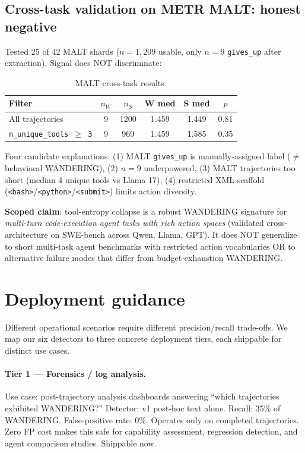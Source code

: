 \documentclass[11pt]{article}
\begin{document}
\subsection{Cross-task validation on METR MALT: honest negative}\label{sec:malt}
Tested 25 of 42 MALT shards ($n = 1{,}209$ usable, only $n = 9$ \texttt{gives\_up} after extraction). Signal does NOT discriminate:

\begin{table}[h]
\centering
\caption{MALT cross-task results.}
\begin{tabular}{lccccc}
\toprule
Filter & $n_W$ & $n_S$ & W med & S med & $p$ \\
\midrule
All trajectories & 9 & 1200 & 1.459 & 1.449 & 0.81 \\
\texttt{n\_unique\_tools $\geq$ 3} & 9 & 969 & 1.459 & 1.585 & 0.35 \\
\bottomrule
\end{tabular}
\end{table}

Four candidate explanations: (1) MALT \texttt{gives\_up} is manually-assigned label ($\ne$ behavioral WANDERING), (2) $n=9$ underpowered, (3) MALT trajectories too short (median 4 unique tools vs Llama 17), (4) restricted XML scaffold (\texttt{<bash>}/\texttt{<python>}/\texttt{<submit>}) limits action diversity.

\textbf{Scoped claim}: tool-entropy collapse is a robust WANDERING signature for \emph{multi-turn code-execution agent tasks with rich action spaces} (validated cross-architecture on SWE-bench across Qwen, Llama, GPT). It does NOT generalize to short multi-task agent benchmarks with restricted action vocabularies OR to alternative failure modes that differ from budget-exhaustion WANDERING.

\section{Deployment guidance}\label{sec:deployment}

Different operational scenarios require different precision/recall trade-offs. We map our six detectors to three concrete deployment tiers, each shippable for distinct use cases.

\paragraph{Tier 1 — Forensics / log analysis.} Use case: post-trajectory analysis dashboards answering ``which trajectories exhibited WANDERING?'' Detector: v1 post-hoc text alone. Recall: 35\% of WANDERING. False-positive rate: 0\%. Operates only on completed trajectories. Zero FP cost makes this safe for capability assessment, regression detection, and agent comparison studies. Shippable now.
\end{document}
